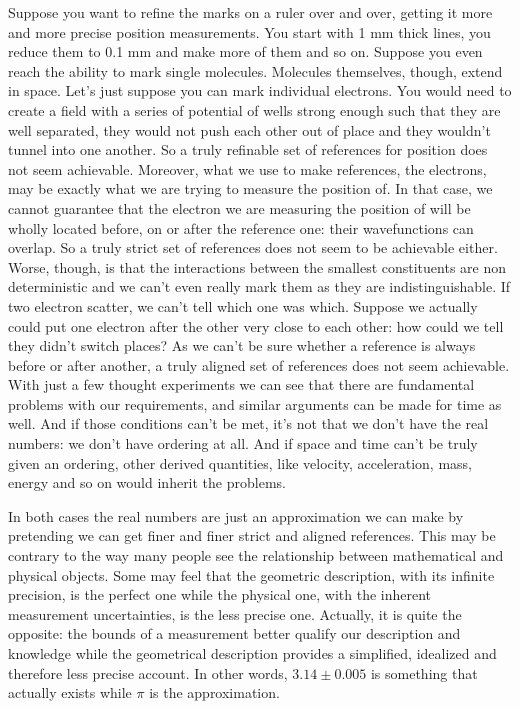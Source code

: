 \documentclass[11pt,letterpaper,fleqn]{memoir} %
\begin{document}
Suppose you want to refine the marks on a ruler over and over, getting it more and more precise position measurements. You start with 1 mm thick lines, you reduce them to 0.1 mm and make more of them and so on. Suppose you even reach the ability to mark single molecules. Molecules themselves, though, extend in space. Let's just suppose you can mark individual electrons. You would need to create a field with a series of potential of wells strong enough such that they are well separated, they would not push each other out of place and they wouldn't tunnel into one another. So a truly refinable set of references for position does not seem achievable. Moreover, what we use to make references, the electrons, may be exactly what we are trying to measure the position of. In that case, we cannot guarantee that the electron we are measuring the position of will be wholly located before, on or after the reference one: their wavefunctions can overlap. So a truly strict set of references does not seem to be achievable either. Worse, though, is that the interactions between the smallest constituents are non deterministic and we can't even really mark them as they are indistinguishable. If two electron scatter, we can't tell which one was which. Suppose we actually could put one electron after the other very close to each other: how could we tell they didn't switch places? As we can't be sure whether a reference is always before or after another, a truly aligned set of references does not seem achievable. With just a few thought experiments we can see that there are fundamental problems with our requirements, and similar arguments can be made for time as well. And if those conditions can't be met, it's not that we don't have the real numbers: we don't have ordering at all. And if space and time can't be truly given an ordering, other derived quantities, like velocity, acceleration, mass, energy and so on would inherit the problems.

In both cases the real numbers are just an approximation we can make by pretending we can get finer and finer strict and aligned references. This may be contrary to the way many people see the relationship between mathematical and physical objects. Some may feel that the geometric description, with its infinite precision, is the perfect one while the physical one, with the inherent measurement uncertainties, is the less precise one. Actually, it is quite the opposite: the bounds of a measurement better qualify our description and knowledge while the geometrical description provides a simplified, idealized and therefore less precise account. In other words, $3.14 \pm 0.005$ is something that actually exists while $\pi$ is the approximation.
\end{document}
